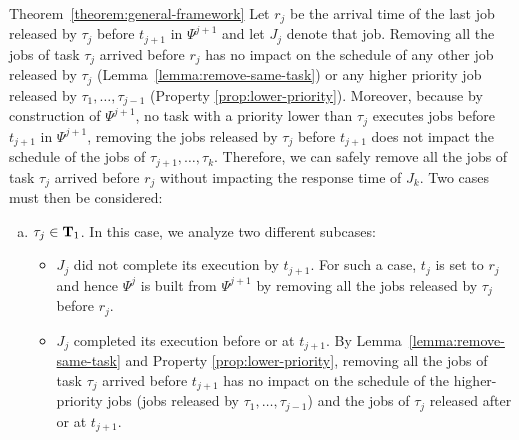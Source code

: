 \begin{appProof}{Theorem~\ref{theorem:general-framework}}
Let $r_j$ be the arrival time of the last job released by $\tau_j$ before $t_{j+1}$ in $\Psi^{j+1}$ and let $J_{j}$ denote that job. %
Removing all the jobs of task $\tau_j$ arrived before $r_j$ has no impact on the schedule of any other job released by $\tau_j$ (Lemma~\ref{lemma:remove-same-task}) or any higher priority job released by $\tau_1, \ldots, \tau_{j-1}$ (Property \ref{prop:lower-priority}). Moreover, because by construction of $\Psi^{j+1}$, no task with a priority lower than $\tau_j$ executes jobs before $t_{j+1}$ in $\Psi^{j+1}$, removing the jobs released by $\tau_j$ before $t_{j+1}$ does not impact the schedule of the jobs of $\tau_{j+1}, \ldots, \tau_{k}$. Therefore, we can safely remove all the jobs of task $\tau_j$ arrived before $r_j$ without impacting the response time of $J_{k}$. Two cases must then be considered:
\begin{enumerate}[(a)]
\item $\tau_j \in {\bf T}_1$. In this case, we analyze two different subcases:
\begin{itemize}
\item $J_{j}$ did not complete its execution by $t_{j+1}$. For such a case, $t_{j}$ is set to $r_j$ and hence $\Psi^j$ is built from $\Psi^{j+1}$ by removing all the jobs released by $\tau_j$ before $r_j$.
\item $J_{j}$ completed its execution before or at $t_{j+1}$. By Lemma~\ref{lemma:remove-same-task} and Property \ref{prop:lower-priority}, removing all the jobs of task $\tau_j$ arrived before $t_{j+1}$ has no impact on the schedule of the higher-priority jobs (jobs released by $\tau_1, \ldots, \tau_{j-1}$) and the jobs of $\tau_j$ released after or at $t_{j+1}$. 

\end{itemize}
\end{enumerate}
\end{appProof}
